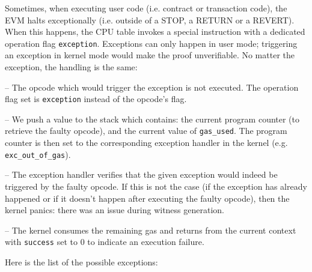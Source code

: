 Sometimes, when executing user code (i.e. contract or transaction code), the EVM halts exceptionally (i.e. outside of a STOP, a RETURN or a REVERT).
When this happens, the CPU table invokes a special instruction with a dedicated operation flag \texttt{exception}.
Exceptions can only happen in user mode; triggering an exception in kernel mode would make the proof unverifiable.
No matter the exception, the handling is the same:

-- The opcode which would trigger the exception is not executed. The operation flag set is \texttt{exception} instead of the opcode's flag.

-- We push a value to the stack which contains: the current program counter (to retrieve the faulty opcode), and the current value of \texttt{gas\_used}.
The program counter is then set to the corresponding exception handler in the kernel (e.g. \texttt{exc\_out\_of\_gas}).

-- The exception handler verifies that the given exception would indeed be triggered by the faulty opcode. If this is not the case (if the exception has already happened or if it doesn't happen after executing
the faulty opcode), then the kernel panics: there was an issue during witness generation.

-- The kernel consumes the remaining gas and returns from the current context with \texttt{success} set to 0 to indicate an execution failure.

Here is the list of the possible exceptions:

